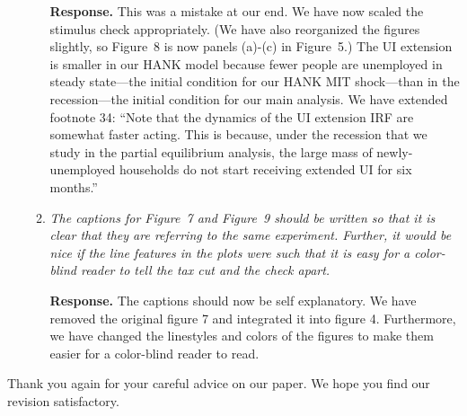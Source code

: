 \documentclass[12pt,letterpaper,english]{article}
\begin{document}
\begin{itemize}
\begin{enumerate}[start=2]
		\noindent \textbf{Response.} This was a mistake at our end. We have now scaled the stimulus check appropriately. (We have also reorganized the figures slightly, so Figure~8 is now panels (a)-(c) in Figure~5.) The UI extension is smaller in our HANK model because fewer people are unemployed in steady state---the initial condition for our HANK MIT shock---than in the recession---the initial condition for our main analysis. We have extended footnote 34: ``Note that the dynamics of the UI extension IRF are somewhat faster acting. This is because, under the recession that we study in the partial equilibrium analysis, the large mass of newly-unemployed households do not start receiving extended UI for six months.'' 
		
		\item \textit{The captions for Figure~7 and Figure~9 should be written so that it is clear that they are referring to the same experiment. Further, it would be nice if the line features in the plots were such that it is easy for a color-blind reader to tell the tax cut and the check apart.}
		
		\noindent \textbf{Response.}  	The captions should now be self explanatory. We have removed the original figure 7 and integrated it into figure 4. Furthermore, we have changed the linestyles and colors of the figures to make them easier for a color-blind reader to read.
			
	\end{enumerate}
	

	
\end{itemize}

	
	\bigskip
	
	\noindent Thank you again for your careful advice on our paper. We hope you find our revision satisfactory.
	


\end{document}
